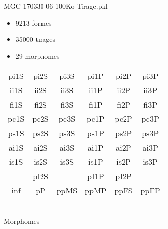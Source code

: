 MGC-170330-06-100Ko-Tirage.pkl
\begin{itemize}
\item 9213 formes
\item 35000 tirages
\item 29 morphomes
\end{itemize}
\begin{center}
\begin{tabular}{cccccc}
\hline
\cellcolor{white}pi1S & \cellcolor{orange}pi2S & \cellcolor{orange}pi3S & \cellcolor{white}pi1P & \cellcolor{white}pi2P & \cellcolor{white}pi3P\\
\cellcolor{brown}ii1S & \cellcolor{brown}ii2S & \cellcolor{brown}ii3S & \cellcolor{white}ii1P & \cellcolor{white}ii2P & \cellcolor{brown}ii3P\\
\cellcolor{yellow}fi1S & \cellcolor{lime}fi2S & \cellcolor{lime}fi3S & \cellcolor{green}fi1P & \cellcolor{white}fi2P & \cellcolor{green}fi3P\\
\cellcolor{yellow}pc1S & \cellcolor{yellow}pc2S & \cellcolor{yellow}pc3S & \cellcolor{white}pc1P & \cellcolor{white}pc2P & \cellcolor{yellow}pc3P\\
\cellcolor{teal}ps1S & \cellcolor{white}ps2S & \cellcolor{teal}ps3S & \cellcolor{white}ps1P & \cellcolor{blue}ps2P & \cellcolor{teal}ps3P\\
\cellcolor{white}ai1S & \cellcolor{lightgray}ai2S & \cellcolor{lightgray}ai3S & \cellcolor{blue}ai1P & \cellcolor{pink}ai2P & \cellcolor{white}ai3P\\
\cellcolor{black}is1S & \cellcolor{pink}is2S & \cellcolor{lightgray}is3S & \cellcolor{black}is1P & \cellcolor{black}is2P & \cellcolor{pink}is3P\\
--- & \cellcolor{white}pI2S & --- & \cellcolor{white}pI1P & \cellcolor{white}pI2P & ---\\
\cellcolor{white}inf & \cellcolor{white}pP & \cellcolor{white}ppMS & \cellcolor{white}ppMP & \cellcolor{pink}ppFS & \cellcolor{pink}ppFP\\
\hline
\end{tabular}\\
Morphomes
\end{center}
\bigskip

